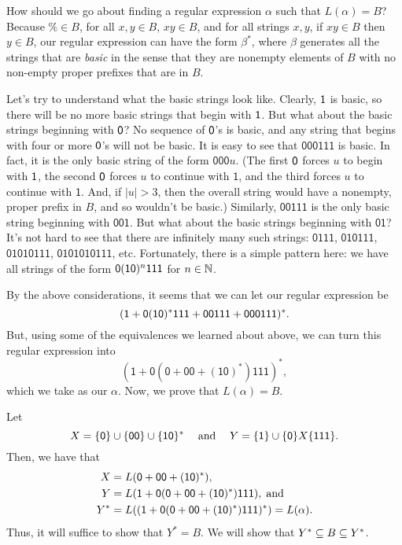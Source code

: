 How should we go about finding a regular expression $\alpha$ such that
$L(\alpha)=B$?  Because $\%\in B$, for all $x,y\in B$, $xy\in B$, and
for all strings $x,y$, if $xy\in B$ then $y\in B$,
our regular expression can have the form $\beta^*$, where $\beta$
generates all the strings that are \emph{basic} in the sense that they
are nonempty elements of $B$ with no non-empty proper prefixes that
are in $B$.

Let's try to understand what the basic strings look like.  Clearly,
$\mathsf{1}$ is basic, so there will be no more basic strings that begin
with $\mathsf{1}$.  But what about the basic strings beginning with
$\mathsf{0}$?  No sequence of $\mathsf{0}$'s is basic, and any string that
begins with four or more $\mathsf{0}$'s will not be basic.  It is easy to
see that $\mathsf{000111}$ is basic.  In fact, it is the only basic
string of the form $\mathsf{000}u$.  (The first $\mathsf{0}$ forces $u$
to begin with $\mathsf{1}$, the second $\mathsf{0}$ forces $u$ to continue
with $\mathsf{1}$, and the third forces $u$ to continue with
$\mathsf{1}$.  And, if $|u|>3$, then the overall string would have a
nonempty, proper prefix in $B$, and so wouldn't be basic.)  Similarly,
$\mathsf{00111}$ is the only basic string beginning with
$\mathsf{001}$.  But what about the basic strings beginning with
$\mathsf{01}$?  It's not hard to see that there are infinitely many
such strings: $\mathsf{0111}$, $\mathsf{010111}$, $\mathsf{01010111}$,
$\mathsf{0101010111}$, etc.  Fortunately, there is a simple pattern
here: we have all strings of the form
$\mathsf{0}(\mathsf{10})^n\mathsf{111}$ for $n\in\mathbb{N}$.

By the above considerations, it seems that we can let our regular
expression be
\begin{displaymath}
(\mathsf{1} + \mathsf{0}(\mathsf{10})^*\mathsf{111} + \mathsf{00111} +
\mathsf{000111})^* .
\end{displaymath}
But, using some of the equivalences we learned about above,
we can turn this regular expression into
\begin{displaymath}
\mathsf{(1 + 0(0 + 00 + (10)^*)111)^*} ,
\end{displaymath}
which we take as our $\alpha$.  Now, we prove that $L(\alpha)=B$.

Let
\begin{displaymath}
X = \mathsf{\{0\} \cup \{00\} \cup \{10\}^*} \quad \;\allowbreak\mbox{and}\allowbreak\; \quad
Y = \{\mathsf{1}\}\cup\{\mathsf{0}\}X\{\mathsf{111}\} .
\end{displaymath}
Then, we have that
\begin{align*}
X &= L(\mathsf{0 + 00 + (10)^*}) , \\
Y &= L(\mathsf{1 + 0(0 + 00 + (10)^*)111}) , \;\allowbreak\mbox{and}\allowbreak\; \\
Y^* &= L(\mathsf{(1 + 0(0 + 00 + (10)^*)111)^*}) = L(\alpha) .
\end{align*}
Thus, it will suffice to show that $Y^* = B$.  We will show that
$Y^*\subseteq B\subseteq Y^*$.

